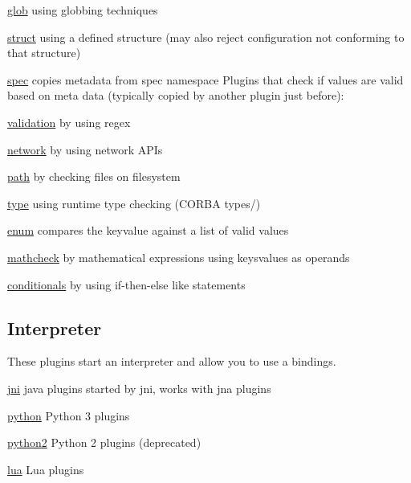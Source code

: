 \begin{DoxyItemize}
\item \hyperlink{md_src_plugins_glob_README_src_plugins_glob_README_md}{glob} using globbing techniques
\item \hyperlink{md_src_plugins_struct_README_src_plugins_struct_README_md}{struct} using a defined structure (may also reject configuration not conforming to that structure)
\item \hyperlink{md_src_plugins_spec_README_src_plugins_spec_README_md}{spec} copies metadata from spec namespace Plugins that check if values are valid based on meta data (typically copied by another plugin just before)\+:
\item \hyperlink{md_src_plugins_validation_README_src_plugins_validation_README_md}{validation} by using regex
\item \hyperlink{md_src_plugins_network_README_src_plugins_network_README_md}{network} by using network A\+P\+Is
\item \hyperlink{md_src_plugins_path_README_src_plugins_path_README_md}{path} by checking files on filesystem
\item \hyperlink{md_src_plugins_type_README_src_plugins_type_README_md}{type} using runtime type checking (C\+O\+R\+B\+A types/)
\item \hyperlink{md_src_plugins_enum_README_src_plugins_enum_README_md}{enum} compares the keyvalue against a list of valid values
\item \hyperlink{md_src_plugins_mathcheck_README_src_plugins_mathcheck_README_md}{mathcheck} by mathematical expressions using keysvalues as operands
\item \hyperlink{md_src_plugins_conditionals_README_src_plugins_conditionals_README_md}{conditionals} by using if-\/then-\/else like statements
\end{DoxyItemize}

\subsection*{Interpreter}

These plugins start an interpreter and allow you to use a bindings.


\begin{DoxyItemize}
\item \hyperlink{md_src_plugins_jni_README_src_plugins_jni_README_md}{jni} java plugins started by jni, works with jna plugins
\item \hyperlink{md_src_plugins_python_README_src_plugins_python_README_md}{python} Python 3 plugins
\item \hyperlink{md_src_plugins_python2_README_src_plugins_python2_README_md}{python2} Python 2 plugins (deprecated)
\item \hyperlink{md_src_plugins_lua_README_src_plugins_lua_README_md}{lua} Lua plugins
\end{DoxyItemize}

